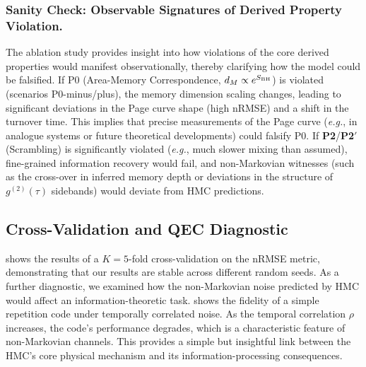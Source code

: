 \documentclass[11pt,a4paper]{article}
\newcommand{\Ptwo}{\textbf{P2}\xspace}
\newcommand{\PtwoPrime}{\textbf{P2$'$}\xspace}
\newcommand{\eg}{\textit{e.g.}\xspace}
\newcommand{\HMC}{\textsc{HMC}\xspace}
\theoremstyle{plain}
\theoremstyle{definition}
\theoremstyle{remark}
\begin{document}
\subsubsection{Sanity Check: Observable Signatures of Derived Property Violation.}
The ablation study provides insight into how violations of the core derived properties would manifest observationally, thereby clarifying how the model could be falsified. If P0 (Area-Memory Correspondence, $d_M \propto e^{S_{\rm BH}}$) is violated (scenarios P0-minus/plus), the memory dimension scaling changes, leading to significant deviations in the Page curve shape (high nRMSE) and a shift in the turnover time. This implies that precise measurements of the Page curve (\eg, in analogue systems or future theoretical developments) could falsify P0. If \Ptwo/\PtwoPrime{} (Scrambling) is significantly violated (\eg, much slower mixing than assumed), fine-grained information recovery would fail, and non-Markovian witnesses (such as the cross-over in inferred memory depth or deviations in the structure of $g^{(2)}(\tau)$ sidebands) would deviate from \HMC{} predictions.

\subsection{Cross-Validation and QEC Diagnostic}
 shows the results of a $K=5$-fold cross-validation on the nRMSE metric, demonstrating that our results are stable across different random seeds. As a further diagnostic, we examined how the non-Markovian noise predicted by \HMC{} would affect an information-theoretic task.  shows the fidelity of a simple repetition code under temporally correlated noise. As the temporal correlation $\rho$ increases, the code's performance degrades, which is a characteristic feature of non-Markovian channels. This provides a simple but insightful link between the \HMC{}'s core physical mechanism and its information-processing consequences.

\begin{table}[htbp]
\centering
\caption{$K=5$ cross-validation of nRMSE to Page curve (stable across seed subsets).}
\label{tab:cv}
\vspace{0.5em}
\footnotesize
{}
\pgfplotstabletypeset{\datatableCVsummary}
\end{table}
\end{document}
